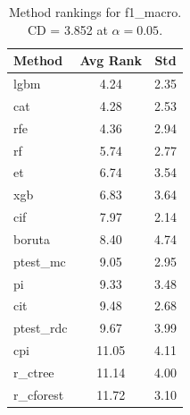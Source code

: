 \begin{table}[h]
\centering
\caption{Method rankings for f1_macro. CD = 3.852 at $\alpha=0.05$.}
\label{tab:ranks_f1_macro}
\begin{tabular}{lcc}
\toprule
Method & Avg Rank & Std \\
\midrule
lgbm & 4.24 & 2.35 \\
cat & 4.28 & 2.53 \\
rfe & 4.36 & 2.94 \\
rf & 5.74 & 2.77 \\
et & 6.74 & 3.54 \\
xgb & 6.83 & 3.64 \\
cif & 7.97 & 2.14 \\
boruta & 8.40 & 4.74 \\
ptest_mc & 9.05 & 2.95 \\
pi & 9.33 & 3.48 \\
cit & 9.48 & 2.68 \\
ptest_rdc & 9.67 & 3.99 \\
cpi & 11.05 & 4.11 \\
r_ctree & 11.14 & 4.00 \\
r_cforest & 11.72 & 3.10 \\
\bottomrule
\end{tabular}
\end{table}